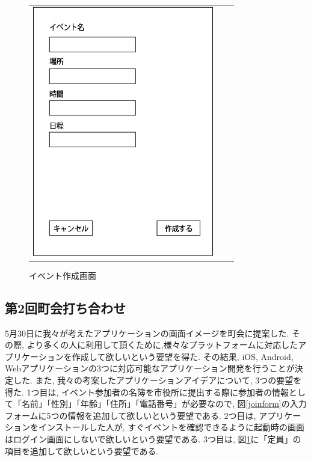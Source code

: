 \begin{figure}[h]
\begin{tabular}{ccc}
\begin{minipage}[t]{0.33\hsize}
        \caption{参加フォーム画面}
        \label{joinform}
      \end{minipage}
      \begin{minipage}[t]{0.33\hsize}
        \centering
        \includegraphics[keepaspectratio, scale=0.4]{process_figures/old_create_event.png}
        \caption{イベント作成画面}
        \label{create_event.old}
      \end{minipage}
    \end{tabular}
\end{figure}

\subsection{第2回町会打ち合わせ}
\label{first_review}
5月30日に我々が考えたアプリケーションの画面イメージを町会に提案した.
その際, より多くの人に利用して頂くために,様々なプラットフォームに対応したアプリケーションを作成して欲しいという要望を得た.
その結果, iOS, Android, Webアプリケーションの3つに対応可能なアプリケーション開発を行うことが決定した.
また, 我々の考案したアプリケーションアイデアについて, 3つの要望を得た.
1つ目は, イベント参加者の名簿を市役所に提出する際に参加者の情報として「名前」「性別」「年齢」「住所」「電話番号」が必要なので,
図\ref{joinform}の入力フォームに5つの情報を追加して欲しいという要望である.
2つ目は, アプリケーションをインストールした人が, すぐイベントを確認できるように起動時の画面はログイン画面にしないで欲しいという要望である.
3つ目は, 図\ref{create_event.old}に「定員」の項目を追加して欲しいという要望である.

